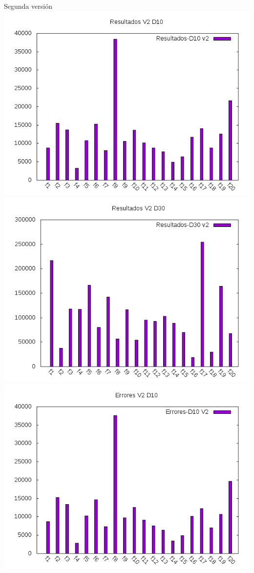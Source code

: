 \documentclass[10pt]{beamer}
\begin{document}
	\begin{frame}[fragile]{Segunda versión}
		\centering
		\includegraphics[scale=0.25]{./Imagenes/Resultados/resultados_v2_d10.png}
		\includegraphics[scale=0.25]{./Imagenes/Resultados/resultados_v2_d30.png}
		\includegraphics[scale=0.25]{./Imagenes/Errores/errores_v2_d10.png}

\end{frame}
\end{document}
